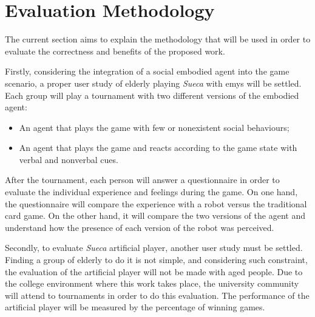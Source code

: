 \section{Evaluation Methodology} \label{sec:evaluation}

The current section aims to explain the methodology that will be used in order to evaluate the correctness and benefits of the proposed work.


Firstly, considering the integration of a social embodied agent into the game scenario, a proper user study of elderly playing \emph{Sueca} with \gls{emys} will be settled.
Each group will play a tournament with two different versions of the embodied agent:
\begin{itemize}
\item An agent that plays the game with few or nonexistent social behaviours;
\item An agent that plays the game and reacts according to the game state with verbal and nonverbal cues.
\end{itemize}
After the tournament, each person will answer a questionnaire in order to evaluate the individual experience and feelings during the game.
On one hand, the questionnaire will compare the experience with a robot versus the traditional card game.
On the other hand, it will compare the two versions of the agent and understand how the presence of each version of the robot was perceived.


Secondly, to evaluate \emph{Sueca} artificial player, another user study must be settled.
Finding a group of elderly to do it is not simple, and considering such constraint, the evaluation of the artificial player will not be made with aged people.
Due to the college environment where this work takes place, the university community will attend to tournaments in order to do this evaluation.
The performance of the artificial player will be measured by the percentage of winning games.